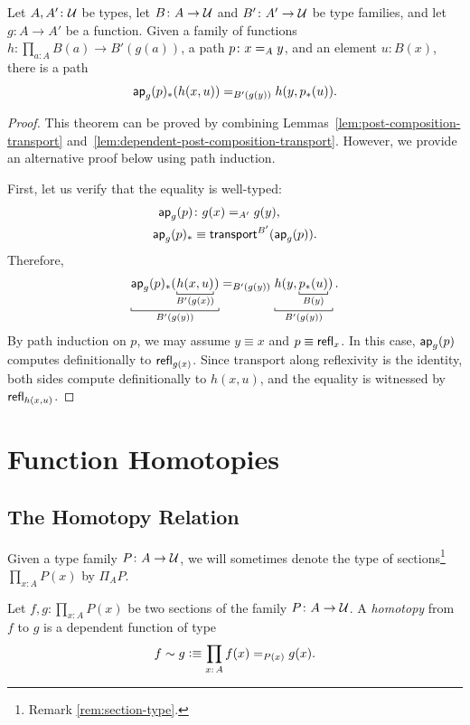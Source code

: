\begin{thm}\label{thm:general-post-composition-transport}
    Let\/ $A, A'\colon\univ$ be types, let\/ $B\colon A\to\univ$ and\/ $B'\colon A'\to\univ$ be type families, and let\/ $g\colon A\to A'$ be a function. Given a family of functions\/ $h\colon\prod_{a\colon A}B(a)\to B'(g(a))$, a path\/ $p\colon x\eq{A}y$, and an element\/ $u\colon B(x)$, there is a path
    \[
        \mathsf{ap}_g(p)_*(h(x,u))\mathrel{=_{B'(g(y))}}h(y,p_*(u)).
    \]
\end{thm}

\begin{proof}
    This theorem can be proved by combining Lemmas~\ref{lem:post-composition-transport} and~\ref{lem:dependent-post-composition-transport}. However, we provide an alternative proof below using path induction.

    First, let us verify that the equality is well-typed:
    \begin{align*}
        \fun{ap}_g(p)&\colon g(x)\eq{A'}g(y),\\
        \fun{ap}_g(p)_*
            &\equiv\fun{transport}^{B'}(\fun{ap}_g(p)).
    \end{align*}
    Therefore,
    \[
        \explain[B'(g(y))]
        {\fun{ap}_g(p)_*(\explain[B'(g(x))]{h(x,u)})}
        \eq{B'(g(y))}
        \explain[B'(g(y))]{h(y,\explain[B(y)]{p_*(u)})}.
    \]
    By path induction on $p$, we may assume $y\equiv x$ and $p\equiv\mathsf{refl}_x$. In this case, $\mathsf{ap}_g(p)$ computes definitionally to $\mathsf{refl}_{g(x)}$. Since transport along reflexivity is the identity, both sides compute definitionally to $h(x,u)$, and the equality is witnessed by $\mathsf{refl}_{h(x,u)}$.
\end{proof}

\section{Function Homotopies}

\subsection{The Homotopy Relation}

\begin{ntn}
    Given a type family $P\colon A\to\univ$, we will sometimes denote the type of sections\footnote{Remark \ref{rem:section-type}.} $\prod_{x\colon A}P(x)$ by $\Pi_AP$.
\end{ntn}

\begin{defn}\label{defn:homotopy}
    Let\/ $f,g\colon\prod_{x\colon A}P(x)$ be two sections of the family\/ $P\colon A\to\univ$. A \textsl{homotopy} from\/ $f$ to\/ $g$ is a dependent function of type
    \[
        f\sim g\defeq\prod_{x\colon A}f(x)\eq{P(x)}g(x).
    \]
\end{defn}

